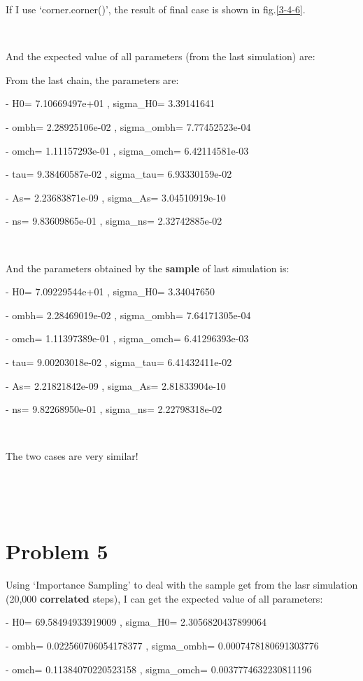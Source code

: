 \documentclass[showpacs, oneside, onecolumn, prl, amsmath, amssymb, nofootinbib, superscriptaddress, notitlepage]{revtex4-1}
\begin{document}
If I use `corner.corner()', the result of final case is shown in fig.\ref{3-4-6}.

~~~~

And the expected value of all parameters (from the last simulation) are:

From the last chain, the parameters are:

- H0= 7.10669497e+01 , 	    sigma\_H0= 3.39141641

- ombh= 2.28925106e-02 , 	sigma\_ombh= 7.77452523e-04

- omch= 1.11157293e-01 , 	sigma\_omch= 6.42114581e-03

- tau= 9.38460587e-02 , 	sigma\_tau= 6.93330159e-02

- As= 2.23683871e-09 , 		sigma\_As= 3.04510919e-10

- ns= 9.83609865e-01 , 	    sigma\_ns= 2.32742885e-02

~~~~

And the parameters obtained by the \textbf{sample} of last simulation is:

- H0= 7.09229544e+01 , 	    sigma\_H0= 3.34047650

- ombh= 2.28469019e-02 , 	sigma\_ombh= 7.64171305e-04

- omch= 1.11397389e-01 , 	sigma\_omch= 6.41296393e-03

- tau= 9.00203018e-02 , 	sigma\_tau= 6.41432411e-02

- As= 2.21821842e-09 , 		sigma\_As= 2.81833904e-10

- ns= 9.82268950e-01 , 	    sigma\_ns= 2.22798318e-02

~~~~

The two cases are very similar!

~~~~

~~~~

\section{Problem 5}

Using `Importance Sampling' to deal with the sample get from the lasr simulation (20,000 \textbf{correlated} steps), I can get the expected value of all parameters:

- H0= 69.58494933919009 , 	    sigma\_H0= 2.3056820437899064

- ombh= 0.022560706054178377 , 	sigma\_ombh= 0.0007478180691303776

- omch= 0.11384070220523158 , 	sigma\_omch= 0.0037774632230811196
\end{document}
